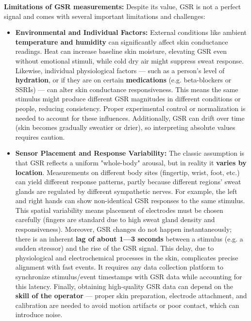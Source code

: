 \documentclass[11pt,a4paper]{report}
\begin{document}
\textbf{Limitations of GSR measurements:} Despite its value, GSR is not a
perfect signal and comes with several important limitations and
challenges\cite{ElectrodermalActivityWiki}\cite{ElectrodermalActivityWiki}:

\begin{itemize}
\item \textbf{Environmental and Individual Factors:} External conditions like
  ambient \textbf{temperature and humidity} can significantly affect skin
  conductance
  readings\cite{ElectrodermalActivityWiki}.
  Heat can increase baseline skin moisture, elevating GSR even without
  emotional stimuli, while cold dry air might suppress sweat response.
  Likewise, individual physiological factors --- such as a person's level
  of \textbf{hydration}, or if they are on certain \textbf{medications} (e.g.
  beta-blockers or SSRIs) --- can alter skin conductance
  responsiveness\cite{ElectrodermalActivityWiki}.
  This means the same stimulus might produce different GSR magnitudes in
  different conditions or people, reducing consistency. Proper
  experimental control or normalization is needed to account for these
  influences. Additionally, GSR can drift over time (skin becomes
  gradually sweatier or drier), so interpreting absolute values requires
  caution.
\item \textbf{Sensor Placement and Response Variability:} The classic assumption
  is that GSR reflects a uniform "whole-body" arousal, but in reality it
  \textbf{varies by location}. Measurements on different body sites
  (fingertip, wrist, foot, etc.) can yield different response patterns,
  partly because different regions' sweat glands are regulated by
  different sympathetic
  nerves\cite{ElectrodermalActivityWiki}.
  For example, the left and right hands can show non-identical GSR
  responses to the same
  stimulus\cite{ElectrodermalActivityWiki}.
  This spatial variability means placement of electrodes must be chosen
  carefully (fingers are standard due to high sweat gland density and
  responsiveness). Moreover, GSR changes do not happen instantaneously;
  there is an inherent \textbf{lag of about 1---3 seconds} between a stimulus
  (e.g. a sudden stressor) and the rise of the GSR
  signal\cite{ElectrodermalActivityWiki}.
  This delay, due to physiological and electrochemical processes in the
  skin, complicates precise alignment with fast events. It requires any
  data collection platform to synchronize stimulus/event timestamps with
  GSR data while accounting for this latency. Finally, obtaining
  high-quality GSR data can depend on the \textbf{skill of the
  operator}\cite{ElectrodermalActivityWiki}
  --- proper skin preparation, electrode attachment, and calibration are
  needed to avoid motion artifacts or poor contact, which can introduce
  noise.

\end{itemize}
\end{document}
